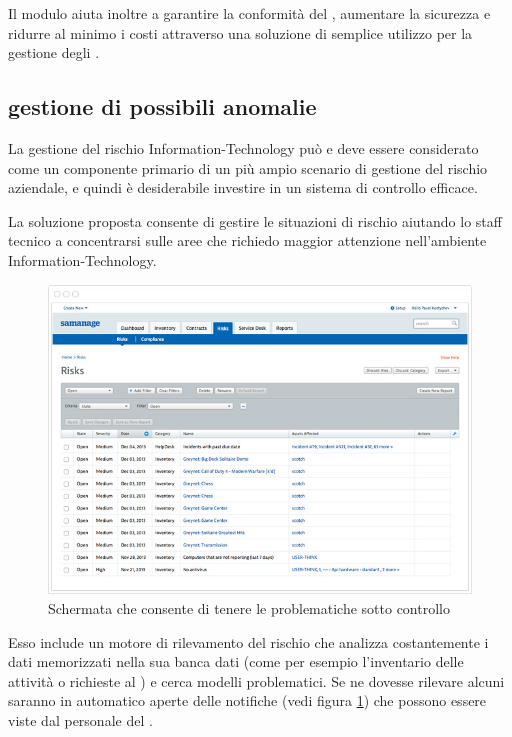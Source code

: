Il modulo aiuta inoltre a garantire la conformità del , aumentare la sicurezza e ridurre al minimo i costi attraverso una soluzione di semplice utilizzo per la gestione degli .

\subsection[Gestione di possibili anomalie]{gestione di possibili anomalie}
\label{sd-risk-management}
La gestione del rischio \acs{Information-Technology} può e deve essere considerato come un componente primario di un più ampio scenario di gestione del rischio aziendale, e quindi è desiderabile investire in un sistema di controllo efficace.

La soluzione  proposta consente di gestire le situazioni di rischio aiutando lo staff tecnico a concentrarsi sulle aree che richiedo maggior attenzione nell'ambiente \acs{Information-Technology}.

\begin{figure}[htbp]
\centering
\includegraphics[scale=0.6]{Images/samanage/Risk_management.png}
\caption{Schermata che consente di tenere le problematiche sotto controllo}
\label{sd-samanage-risk-management-img}
\end{figure}

Esso include un motore di rilevamento del rischio che analizza costantemente i dati memorizzati nella sua banca dati (come per esempio l'inventario delle attività o richieste al ) e cerca modelli problematici. Se ne dovesse rilevare alcuni saranno in automatico aperte delle notifiche (vedi figura \ref{sd-samanage-risk-management-img}) che possono essere viste dal personale del .

